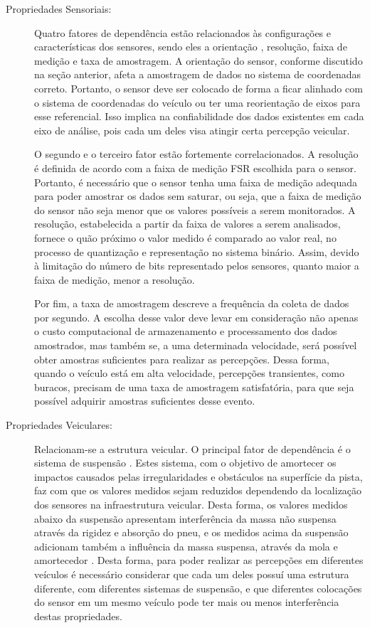 \begin{description}
	
	\item [Propriedades Sensoriais:] 
	
	Quatro fatores de dependência estão relacionados às configurações e características dos sensores, sendo eles a orientação \cite{Kumar2017,Alam2020}, resolução, faixa de medição e taxa de amostragem. A orientação do sensor, conforme discutido na seção anterior, afeta a amostragem de dados no sistema de coordenadas correto. Portanto, o sensor deve ser colocado de forma a ficar alinhado com o sistema de coordenadas do veículo ou ter uma reorientação de eixos para esse referencial. Isso implica na confiabilidade dos dados existentes em cada eixo de análise, pois cada um deles visa atingir certa percepção veicular.

	O segundo e o terceiro fator estão fortemente correlacionados. A resolução é definida de acordo com a faixa de medição FSR escolhida para o sensor. Portanto, é necessário que o sensor tenha uma faixa de medição adequada para poder amostrar os dados sem saturar, ou seja, que a faixa de medição do sensor não seja menor que os valores possíveis a serem monitorados. A resolução, estabelecida a partir da faixa de valores a serem analisados, fornece o quão próximo o valor medido é comparado ao valor real, no processo de quantização e representação no sistema binário. Assim, devido à limitação do número de bits representado pelos sensores, quanto maior a faixa de medição, menor a resolução.
	
	Por fim, a taxa de amostragem descreve a frequência da coleta de dados por segundo. A escolha desse valor deve levar em consideração não apenas o custo computacional de armazenamento e processamento dos dados amostrados, mas também se, a uma determinada velocidade, será possível obter amostras suficientes para realizar as percepções. Dessa forma, quando o veículo está em alta velocidade, percepções transientes, como buracos, precisam de uma taxa de amostragem satisfatória, para que seja possível adquirir amostras suficientes desse evento.
	
	\item [Propriedades Veiculares:] 
	
	Relacionam-se a estrutura veicular. O principal fator de dependência é o sistema de suspensão \cite{Kumar2017, Wickramarathne2018,Alam2020}. Estes sistema, com o objetivo de amortecer os impactos causados pelas irregularidades e obstáculos na superfície da pista, faz com que os valores medidos sejam reduzidos dependendo da localização dos sensores na infraestrutura veicular. Desta forma, os valores medidos abaixo da suspensão apresentam interferência da massa não suspensa através da rigidez e absorção do pneu, e os medidos acima da suspensão adicionam também a influência da massa suspensa, através da mola e amortecedor \cite{Yafeai2019}. Desta forma, para poder realizar as percepções em diferentes veículos é necessário considerar que cada um deles possuí uma estrutura diferente, com diferentes sistemas de suspensão, e que diferentes colocações do sensor em um mesmo veículo pode ter mais ou menos interferência destas propriedades.


\end{description}
